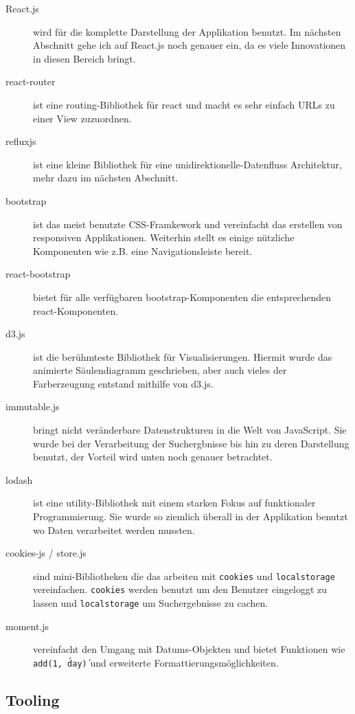 \documentclass[12pt,twoside]{book}
\begin{document}
\begin{description}
	\item[React.js] wird für die komplette Darstellung der Applikation benutzt. Im nächsten Abschnitt gehe ich auf React.js noch genauer ein, da es viele Innovationen in diesen Bereich bringt.
	\item[react-router \cite{reactrouter}] ist eine routing-Bibliothek für react und macht es sehr einfach URLs zu einer View zuzuordnen.
	\item[refluxjs \cite{reflux}] ist eine kleine Bibliothek für eine unidirektionelle-Datenfluss Architektur, mehr dazu im nächsten Abschnitt.
	\item[bootstrap \cite{bootstrap}] ist das meist benutzte CSS-Framkework und vereinfacht das erstellen von responsiven Applikationen. Weiterhin stellt es einige nützliche Komponenten wie z.B. eine Navigationsleiste bereit.
	\item[react-bootstrap \cite{reactrouter}] bietet für alle verfügbaren bootstrap-Komponenten die entsprechenden react-Komponenten.
	\item[d3.js \cite{bostock2011d3}] ist die berühmteste Bibliothek für Visualisierungen. Hiermit wurde das animierte Säulendiagramm geschrieben, aber auch vieles der Farberzeugung entstand mithilfe von d3.js.
	\item[immutable.js \cite{Immutable}] bringt nicht veränderbare Datenstrukturen in die Welt von JavaScript. Sie wurde bei der Verarbeitung der Suchergbnisse bis hin zu deren Darstellung benutzt, der Vorteil wird unten noch genauer betrachtet.
	\item[lodash \cite{lodash}] ist eine utility-Bibliothek mit einem starken Fokus auf funktionaler Programmierung. Sie wurde so ziemlich überall in der Applikation benutzt wo Daten verarbeitet werden mussten.
	\item[cookies-js \cite{cookiesjs} / store.js \cite{storejs}]sind mini-Bibliotheken die das arbeiten mit \texttt{cookies} und \texttt{localstorage} vereinfachen. \texttt{cookies} werden benutzt um den Benutzer eingeloggt zu lassen und \texttt{localstorage} um Suchergebnisse zu cachen.
	\item[moment.js\cite{momentjs}] vereinfacht den Umgang mit Datums-Objekten und bietet Funktionen wie \texttt{add(1, \'day\')} und erweiterte Formattierungsmöglichkeiten.
\end{description}

\subsection{Tooling}
\end{document}
